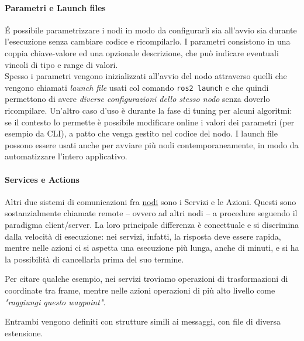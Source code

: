 \paragraph{Parametri e Launch files}
É possibile parametrizzare i nodi in modo da configurarli sia all'avvio sia durante l'esecuzione
senza cambiare codice e ricompilarlo. I parametri consistono in una coppia chiave-valore ed una
opzionale descrizione, che può indicare eventuali vincoli di tipo e range di valori.\\
Spesso i parametri vengono inizializzati all'avvio del nodo attraverso quelli che vengono chiamati
\textit{launch file} usati col comando \verb|ros2 launch| e che quindi permettono di avere \textit{diverse
configurazioni dello stesso nodo} senza doverlo ricompilare. Un'altro caso d'uso è durante la fase di
tuning per alcuni algoritmi: se il contesto lo permette è possibile modificare online i valori dei
parametri (per esempio da CLI), a patto che venga gestito nel codice del nodo.
I launch file possono essere usati anche per avviare più nodi contemporaneamente, in modo da
automatizzare l'intero applicativo.

\paragraph{Services e Actions}
Altri due sistemi di comunicazioni fra \hyperref[ros:nodes]{nodi} sono i Servizi e le Azioni.
Questi sono sostanzialmente chiamate remote -- ovvero ad altri nodi -- a procedure seguendo il paradigma
client/server. La loro principale differenza è concettuale e si discrimina dalla velocità di esecuzione:
nei servizi, infatti, la risposta deve essere rapida, mentre nelle azioni ci si aspetta una esecuzione
più lunga, anche di minuti, e si ha la possibilità di cancellarla prima del suo termine.

Per citare qualche esempio, nei servizi troviamo operazioni di trasformazioni di coordinate tra frame, mentre
nelle azioni operazioni di più alto livello come \textit{"raggiungi questo waypoint"}.

Entrambi vengono definiti con strutture simili ai messaggi, con file di diversa estensione.

